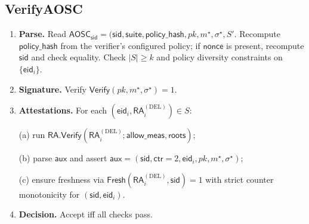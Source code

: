 \documentclass[runningheads,orivec]{llncs}
\newcommand{\sid}{\mathsf{sid}}
\begin{document}
\subsection{VerifyAOSC}
\begin{enumerate}[leftmargin=*,itemsep=0.25em]
  \item \textbf{Parse.} Read $\mathsf{AOSC}_\sid=(\sid,\mathsf{suite},\mathsf{policy\_hash},pk,m^{\star},\sigma^{\star},S'$.
        Recompute $\mathsf{policy\_hash}$ from the verifier’s configured policy; if $\mathsf{nonce}$ is present, recompute $\sid$ and check equality.
        Check $|S|\ge k$ and policy diversity constraints on $\{\mathsf{eid}_i\}$.
  \item \textbf{Signature.} Verify $\mathsf{Verify}(pk,m^{\star},\sigma^{\star})=1$.
  \item \textbf{Attestations.} For each $(\mathsf{eid}_i,\mathsf{RA}^{(\mathrm{DEL})}_i)\in S$:
        
        (a) run $\textsf{RA.Verify}(\mathsf{RA}^{(\mathrm{DEL})}_i;\textsf{allow\_meas},\textsf{roots})$;
        
        (b) parse $\mathsf{aux}$ and assert $\mathsf{aux}=(\sid,\mathsf{ctr}{=}2,\mathsf{eid}_i,pk,m^{\star},\sigma^{\star})$;
        
        (c) ensure freshness via $\textsf{Fresh}(\mathsf{RA}^{(\mathrm{DEL})}_i,\sid)=1$ with strict counter monotonicity for $(\sid,\mathsf{eid}_i)$.
  \item \textbf{Decision.} Accept iff all checks pass.
\end{enumerate}
\end{document}
